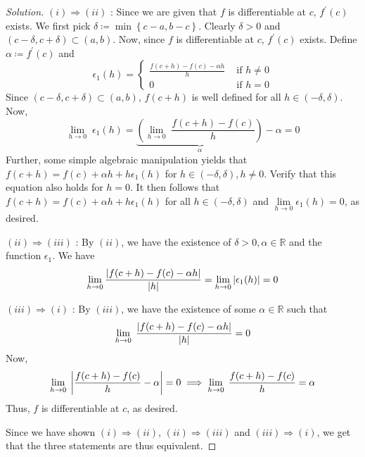 \documentclass[12pt]{article}
\def\ddfrac#1#2{\displaystyle\frac{\displaystyle #1}{\displaystyle #2}}
\theoremstyle{definition}
\newenvironment{soln}{\begin{proof}[Solution]}{\end{proof}}
\begin{document}
\begin{enumerate}[leftmargin=*]
\begin{soln}
        $(i) \Rightarrow (ii)$ : Since we are given that $f$ is differentiable at $c$, $f^{\prime}(c)$ exists. We first pick $\delta \coloneqq \min\left\{c-a, b-c\right\}$. Clearly $\delta>0$ and $(c-\delta, c+\delta) \subset (a,b)$. Now, since $f$ is differentiable at $c$, $f^{\prime}(c)$ exists. Define $\alpha \coloneqq f^{\prime}(c)$ and 
        \[
            \epsilon_1(h) = \begin{cases}
                \ddfrac{f(c+h) - f(c) - \alpha h}{h} & \text{ if } h \neq 0 \\
                0 & \text{ if } h = 0
            \end{cases}
        \]
        Since $(c-\delta, c+\delta) \subset (a,b)$, $f(c+h)$ is well defined for all $h \in (-\delta, \delta)$. Now, 
        \[
            \lim_{h \to 0} \; \epsilon_1(h) = \underbrace{\left( \lim_{h \to 0} \; \frac{f(c+h) - f(c)}{h} \right)}_{\alpha} - \alpha = 0
        \]
        Further, some simple algebraic manipulation yields that $f(c+h) = f(c) + \alpha h + h\epsilon_1(h)$ for $h \in (-\delta, \delta), h \neq 0$. Verify that this equation also holds for $h=0$. It then follows that $f(c+h) = f(c) + \alpha h + h\epsilon_1(h)$ for all $h \in (-\delta, \delta)$ and $\lim\limits_{h \to 0} \epsilon_1(h) = 0$, as desired.
        
        \medskip
        
        $(ii) \Rightarrow (iii)$ : By $(ii)$, we have the existence of $\delta>0, \alpha \in \mathbb{R}$ and the function $\epsilon_1$. We have
        \[
            \lim_{h \to 0} \frac{\abs{f(c+h) - f(c) - \alpha h}}{\abs{h}} = \lim_{h \to 0} \abs{\epsilon_1(h)} = 0
        \]
        
        \medskip
        
        $(iii) \Rightarrow (i)$ : By $(iii)$, we have the existence of some $\alpha \in \mathbb{R}$ such that
        \[
            \lim_{h \to 0} \; \frac{\abs{f(c+h) - f(c) - \alpha h}}{\abs{h}} = 0
        \]
        Now, 
        \[
            \lim_{h \to 0} \; \abs{\frac{f(c+h) - f(c)}{h} - \alpha} = 0 \implies \lim_{h \to 0} \; \frac{f(c+h) - f(c)}{h} = \alpha
        \]
        Thus, $f$ is differentiable at $c$, as desired.
        \medskip
        
        Since we have shown $(i) \Rightarrow (ii)$, $(ii) \Rightarrow (iii)$ and $(iii) \Rightarrow (i)$, we get that the three statements are thus equivalent.
    \end{soln}
    

\end{enumerate}
\end{document}
